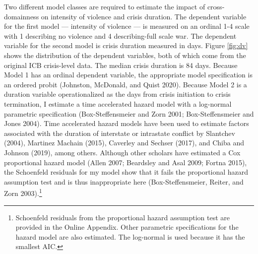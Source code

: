 \documentclass[
]{article}
\begin{document}
Two different model classes are required to estimate the impact of cross-domainness on intensity of violence and crisis duration. The dependent variable for the first model --- intensity of violence --- is measured on an ordinal 1-4 scale with 1 describing no violence and 4 describing-full scale war. The dependent variable for the second model is crisis duration measured in days. Figure \ref{fig:dv} shows the distribution of the dependent variables, both of which come from the original ICB crisis-level data. The median crisis duration is 84 days. Because Model 1 has an ordinal dependent variable, the appropriate model specification is an ordered probit (Johnston, McDonald, and Quist 2020). Because Model 2 is a duration variable operationalized as the days from crisis initiation to crisis termination, I estimate a time accelerated hazard model with a log-normal parametric specification (Box-Steffensmeier and Zorn 2001; Box-Steffensmeier and Jones 2004). Time accelerated hazard models have been used to estimate factors associated with the duration of interstate or intrastate conflict by Slantchev (2004), Martinez Machain (2015), Caverley and Sechser (2017), and Chiba and Johnson (2019), among others. Although other scholars have estimated a Cox proportional hazard model (Allen 2007; Beardsley and Asal 2009; Fortna 2015), the Schoenfeld residuals for my model show that it fails the proportional hazard assumption test and is thus inappropriate here (Box-Steffensmeier, Reiter, and Zorn 2003).\footnote{Schoenfeld residuals from the proportional hazard assumption test are provided in the Online Appendix. Other parametric specifications for the hazard model are also estimated. The log-normal is used because it has the smallest AIC.}
\end{document}
